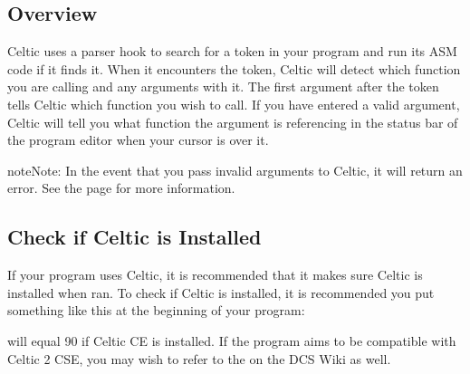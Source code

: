 \documentclass[letterpaper,10pt,english]{sphinxmanual}
\begin{document}
\subsection{Overview}
\label{\detokenize{gensyntax:overview}}
\sphinxAtStartPar
Celtic uses a parser hook to search for a token in your program and run its ASM code if it finds it.
When it encounters the  token, Celtic will detect which function you are calling and any arguments with it.
The first argument after the  token tells Celtic which function you wish to call.
If you have entered a valid argument, Celtic will tell you what function the argument is referencing in the status bar of the program editor when your cursor is over it.

\begin{sphinxadmonition}{note}{Note:}
\sphinxAtStartPar
In the event that you pass invalid arguments to Celtic, it will return an error. See the  page for more information.
\end{sphinxadmonition}


\subsection{Check if Celtic is Installed}
\label{\detokenize{gensyntax:check-if-celtic-is-installed}}
\sphinxAtStartPar
If your program uses Celtic, it is recommended that it makes sure Celtic is installed when ran. To check if Celtic is installed, it is recommended you put something like this at the beginning of your program:

\begin{sphinxVerbatim}[commandchars=\\\{\}]
 \PYG{p}{[}\PYG{p}{[}
 
\end{sphinxVerbatim}

\sphinxAtStartPar
{} will equal 90 if Celtic CE is installed. If the program aims to be compatible with Celtic 2 CSE, you may wish to refer to the  on the DCS Wiki as well.
\end{document}
